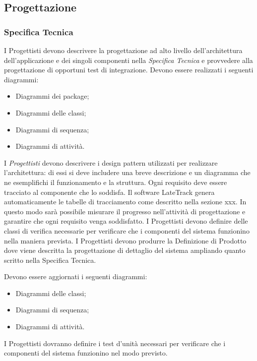 {   \subsection{Progettazione}
	\subsubsection{Specifica Tecnica}
	I Progettisti devono descrivere la progettazione ad alto livello dell'architettura dell'applicazione e dei singoli componenti nella \emph{Specifica Tecnica} e provvedere alla progettazione	di opportuni test di integrazione.
	Devono essere realizzati i seguenti diagrammi:
	\begin{itemize}
	\item Diagrammi dei package;
	\item Diagrammi delle classi;
	\item Diagrammi di sequenza;
	\item Diagrammi di attività.
	\end{itemize}
	I \textit{Progettisti} devono descrivere i design pattern utilizzati per realizzare l'architettura:
	di essi si deve includere una breve descrizione e un diagramma che ne esemplifichi il funzionamento e la struttura.
	Ogni requisito deve essere tracciato al componente che lo soddisfa. Il software LateTrack genera automaticamente le tabelle di tracciamento come descritto nella sezione xxx. In questo modo sarà possibile misurare il progresso nell'attività di progettazione e garantire che ogni requisito venga soddisfatto.
	I Progettisti devono definire delle classi di verifica necessarie per verificare che i componenti del sistema funzionino nella maniera prevista.
	I Progettisti devono produrre la Definizione di Prodotto dove viene descritta la progettazione di dettaglio del sistema ampliando quanto scritto nella Specifica Tecnica.
	
	Devono essere aggiornati i seguenti diagrammi:
	\begin{itemize}
    \item Diagrammi delle classi;
	\item Diagrammi di sequenza;
	\item Diagrammi di attività.
	\end{itemize}

	I Progettisti dovranno definire i test d'unità necessari per verificare che i componenti
	del sistema funzionino nel modo previsto.
}
